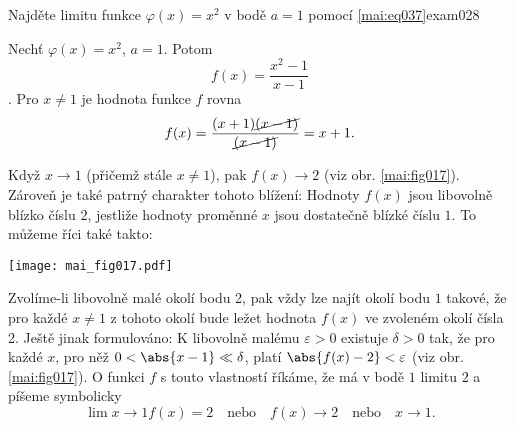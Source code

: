 \begin{mathexam}{Najděte limitu funkce \(\varphi(x) = x^2\) v bodě \(a = 1\) pomocí 
  \eqref{mai:eq037}}{exam028}
  
  Nechť \(\varphi(x) = x^2\), \(a = 1\). Potom \[f(x) = \dfrac{x^2 - 1}{x - 1}\]. Pro \(x \neq 1\)
  je hodnota funkce \(f\) rovna 
  \begin{equation*}
    f(x) = \dfrac{(x + 1)\cancel{(x - 1 )}}{\cancel{(x - 1)}} = x + 1. 
  \end{equation*}
  
  
  Když \(x \rightarrow 1\) (přičemž stále \(x \neq 1\)), pak \(f(x) \rightarrow 2\) (viz obr.
  \ref{mai:fig017}). Zároveň je také patrný charakter tohoto blížení: Hodnoty \(f(x)\) jsou
  libovolně blízko číslu \(2\), jestliže hodnoty proměnné \(x\) jsou dostatečně blízké číslu \(1\).
  To můžeme říci také takto: 
  
  {\centering
  \captionsetup{type=figure}
%   
    \texttt{[image: mai\_fig017.pdf]}
  \par}
  
  Zvolíme-li libovolně malé okolí bodu \num{2}, pak vždy lze najít okolí bodu \(1\) takové, že pro
  každé \(x \neq 1\) z tohoto okolí bude ležet hodnota \(f(x)\) ve zvoleném okolí čísla \num{2}.
  Ještě jinak formulováno: K libovolně malému \(\varepsilon > 0\) existuje \(\delta > 0\) tak, že
  pro každé \(x\), pro něž \(0 < \abs{x - 1} \ll \delta\), platí \(\abs{f(x) - 2} < \varepsilon\)
  (viz obr. \ref{mai:fig017}). O funkci \(f\) s touto vlastností říkáme, že má v bodě \(1\) limitu
  \(2\) a píšeme symbolicky 
  \begin{equation*}
    \lim\limits{x \to 1}f(x) = 2 \quad\text{nebo}\quad 
    f(x) \to 2                    \quad\text{nebo}\quad  x\to 1.
  \end{equation*}
\end{mathexam}